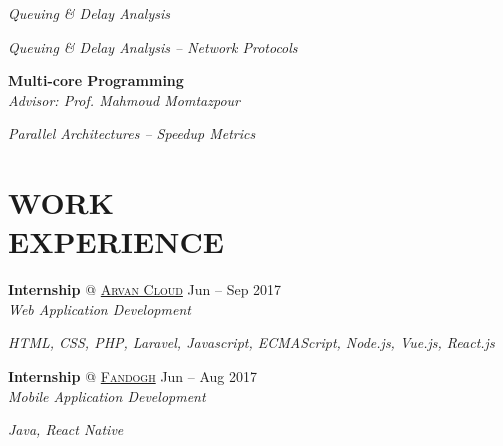 \documentclass[margin, 10pt]{res} %
\begin{document}
\begin{resume}
\begin{innerlist}
			\item \textit{Queuing \& Delay Analysis} \href{https://github.com/aligholamee/Compnets/raw/master/docs/assignment-3/compnet_assignment_3_9531504.pdf}{\hfill\UrlFont[docs]}
			
			\item \textit{Queuing \& Delay Analysis -- Network Protocols} \href{https://github.com/aligholamee/Compnets/raw/master/docs/assignment-4/compnet_assignment_4_9531504.pdf}{\hfill\UrlFont[docs]}
		\end{innerlist}
	
        \textbf{Multi-core Programming}\\
			\textit{Advisor: Prof. Mahmoud Momtazpour}
			\begin{innerlist}
				\item \textit{Parallel Architectures -- Speedup Metrics} \href{https://github.com/aligholamee/Parallax/raw/master/docs/assignment-1/MCP_9531504_HW1.pdf}{\hfill\UrlFont[docs]}

			\end{innerlist}
	
    
    \section{WORK \\ EXPERIENCE}
	\textbf{Internship} \textsc{@}
	\href{https://www.arvancloud.com/}{\textsc{Arvan Cloud}}
	\hfill {Jun -- Sep 2017}\\
	\textit{Web Application Development}
	\begin{innerlist}
		\item \textit{HTML, CSS, PHP, Laravel, Javascript, ECMAScript, Node.js, Vue.js, React.js}
	\end{innerlist}
	
	\textbf{Internship} \textsc{@}
	\href{http://www.fandogh.org/}{\textsc{Fandogh}}
	\hfill {Jun -- Aug 2017}\\
	\textit{Mobile Application Development}
	\begin{innerlist}
		\item \textit{Java, React Native}
	\end{innerlist}

    

\end{resume}
\end{document}
